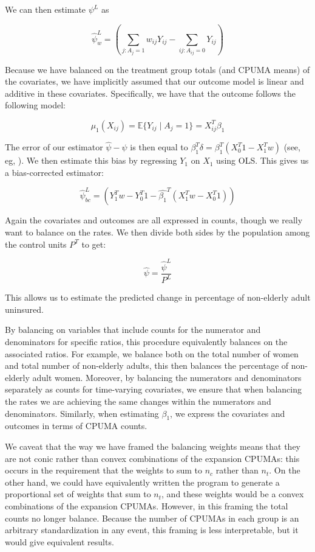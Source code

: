 \documentclass[12pt]{article}
\begin{document}
We can then estimate $\psi^L$ as

$$
\hat{\psi}^L_w = (\sum_{j: A_j = 1}w_{ij}Y_{ij} - \sum_{ij: A_{ij} = 0}Y_{ij})
$$

Because we have balanced on the treatment group totals (and CPUMA means) of the covariates, we have implicitly assumed that our outcome model is linear and additive in these covariates. Specifically, we have that the outcome follows the following model:

$$
\mu_1(X_{ij}) = \mathbb{E}\{Y_{ij} \mid A_j = 1\} = X_{ij}^T\beta_1 
$$

The error of our estimator $\hat{\psi} - \psi$ is then equal to $\beta_1^T \delta = \beta_1^T(X_0^T1 - X_1^Tw)$ (see, eg, \cite{zubizarreta2015stable}). We then estimate this bias by regressing $Y_1$ on $X_1$ using OLS. This gives us a bias-corrected estimator:

$$
\hat{\psi}^L_{bc} = (Y_1^Tw - Y_0^T1 - \hat{\beta_1}^T(X_1^Tw - X_0^T1))
$$

Again the covariates and outcomes are all expressed in counts, though we really want to balance on the rates. We then divide both sides by the population among the control units $P^T$ to get:

$$
\hat{\psi} = \frac{\hat{\psi}^L}{P^L}
$$

This allows us to estimate the predicted change in percentage of non-elderly adult uninsured. 

By balancing on variables that include counts for the numerator and denominators for specific ratios, this procedure equivalently balances on the associated ratios. For example, we balance both on the total number of women and total number of non-elderly adults, this then balances the percentage of non-elderly adult women. Moreover, by balancing the numerators and denominators separately as counts for time-varying covariates, we ensure that when balancing the rates we are achieving the same changes within the numerators and denominators. Similarly, when estimating $\beta_1$, we express the covariates and outcomes in terms of CPUMA counts. 

We caveat that the way we have framed the balancing weights means that they are not conic rather than convex combinations of the expansion CPUMAs: this occurs in the requirement that the weights to sum to $n_c$ rather than $n_t$. On the other hand, we could have equivalently written the program to generate a proportional set of weights that sum to $n_t$, and these weights would be a convex combinations of the expansion CPUMAs. However, in this framing the total counts no longer balance. Because the number of CPUMAs in each group is an arbitrary standardization in any event, this framing is less interpretable, but it would give equivalent results.
\end{document}
